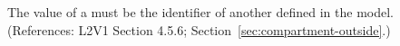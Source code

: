 The   value of a \Compartment must be the identifier of
another \Compartment defined in the model.  (References: L2V1 Section
4.5.6; Section~\ref{sec:compartment-outside}.)
